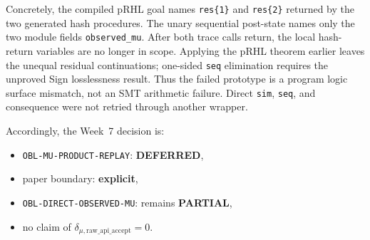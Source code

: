 Concretely, the compiled pRHL goal names
\texttt{res\{1\}} and \texttt{res\{2\}} returned by the two generated hash
procedures. The unary sequential post-state names only the two module fields
\texttt{observed\_mu}. After both trace calls return, the local hash-return
variables are no longer in scope. Applying the pRHL theorem earlier leaves the
unequal residual continuations; one-sided \texttt{seq} elimination requires
the unproved Sign losslessness result. Thus the failed prototype is a program
logic surface mismatch, not an SMT arithmetic failure. Direct \texttt{sim},
\texttt{seq}, and consequence were not retried through another wrapper.

Accordingly, the Week~7 decision is:
\begin{itemize}
\item \texttt{OBL-MU-PRODUCT-REPLAY}: \textbf{DEFERRED},
\item paper boundary: \textbf{explicit},
\item \texttt{OBL-DIRECT-OBSERVED-MU}: remains \textbf{PARTIAL},
\item no claim of $\delta_{\mu,\mathrm{raw\_api\_accept}} = 0$.
\end{itemize}
